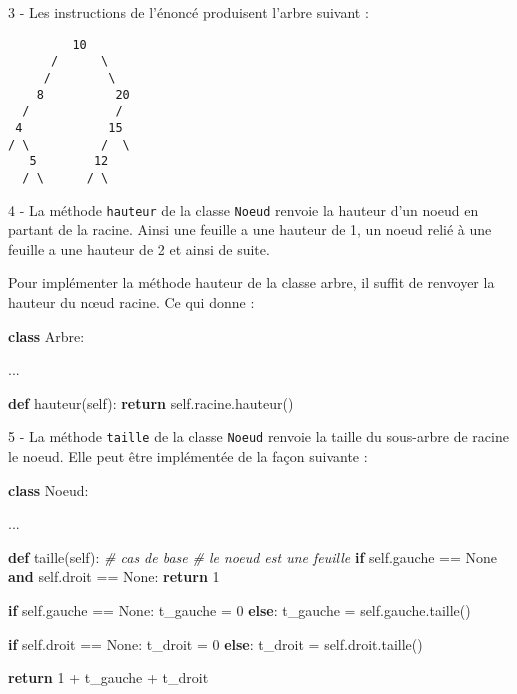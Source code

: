 \documentclass[a4paper,17pt]{extarticle}
\newenvironment{Shaded}{}{}
\newcommand{\KeywordTok}[1]{\textcolor[rgb]{0.00,0.44,0.13}{\textbf{{#1}}}}
\newcommand{\DecValTok}[1]{\textcolor[rgb]{0.25,0.63,0.44}{{#1}}}
\newcommand{\CommentTok}[1]{\textcolor[rgb]{0.38,0.63,0.69}{\textit{{#1}}}}
\newcommand{\NormalTok}[1]{{#1}}
\newcommand{\VariableTok}[1]{\textcolor[rgb]{0.10,0.09,0.49}{{#1}}}
\newcommand{\ControlFlowTok}[1]{\textcolor[rgb]{0.00,0.44,0.13}{\textbf{{#1}}}}
\newcommand{\OperatorTok}[1]{\textcolor[rgb]{0.40,0.40,0.40}{{#1}}}
\begin{document}
    3 - Les instructions de l'énoncé produisent l'arbre suivant :

\begin{verbatim}
         10
      /      \
     /        \
    8          20
  /            /
 4            15
/ \          /  \
   5        12
  / \      / \
\end{verbatim}

    4 - La méthode \texttt{hauteur} de la classe \texttt{Noeud} renvoie la
hauteur d'un noeud en partant de la racine. Ainsi une feuille a une
hauteur de 1, un noeud relié à une feuille a une hauteur de 2 et ainsi
de suite.

Pour implémenter la méthode hauteur de la classe arbre, il suffit de
renvoyer la hauteur du nœud racine. Ce qui donne :

\begin{Shaded}
\begin{Highlighting}[]
\KeywordTok{class}\NormalTok{ Arbre:}

\NormalTok{    ...}

    \KeywordTok{def}\NormalTok{ hauteur(}\VariableTok{self}\NormalTok{):}
        \ControlFlowTok{return} \VariableTok{self}\NormalTok{.racine.hauteur()}
\end{Highlighting}
\end{Shaded}

    5 - La méthode \texttt{taille} de la classe \texttt{Noeud} renvoie la
taille du sous-arbre de racine le noeud. Elle peut être implémentée de
la façon suivante :

\begin{Shaded}
\begin{Highlighting}[]
\KeywordTok{class}\NormalTok{ Noeud:}

\NormalTok{    ...}

    \KeywordTok{def}\NormalTok{ taille(}\VariableTok{self}\NormalTok{):}
        \CommentTok{\# cas de base}
        \CommentTok{\# le noeud est une feuille}
        \ControlFlowTok{if} \VariableTok{self}\NormalTok{.gauche }\OperatorTok{==} \VariableTok{None} \KeywordTok{and} \VariableTok{self}\NormalTok{.droit }\OperatorTok{==} \VariableTok{None}\NormalTok{:}
            \ControlFlowTok{return} \DecValTok{1}
        
        \ControlFlowTok{if} \VariableTok{self}\NormalTok{.gauche }\OperatorTok{==} \VariableTok{None}\NormalTok{:}
\NormalTok{            t\_gauche }\OperatorTok{=} \DecValTok{0}
        \ControlFlowTok{else}\NormalTok{:}
\NormalTok{            t\_gauche }\OperatorTok{=} \VariableTok{self}\NormalTok{.gauche.taille()}
        
        \ControlFlowTok{if} \VariableTok{self}\NormalTok{.droit }\OperatorTok{==} \VariableTok{None}\NormalTok{:}
\NormalTok{            t\_droit }\OperatorTok{=} \DecValTok{0}
        \ControlFlowTok{else}\NormalTok{:}
\NormalTok{            t\_droit }\OperatorTok{=} \VariableTok{self}\NormalTok{.droit.taille()}

        \ControlFlowTok{return} \DecValTok{1} \OperatorTok{+}\NormalTok{ t\_gauche }\OperatorTok{+}\NormalTok{ t\_droit}
\end{Highlighting}
\end{Shaded}
\end{document}
